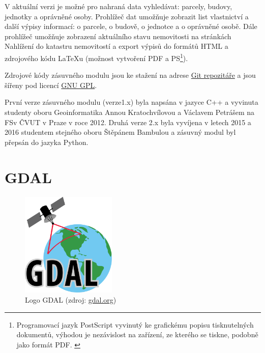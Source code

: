V aktuální verzi je možné pro nahraná data vyhledávat: parcely, budovy, jednotky
a oprávněné osoby. Prohlížeč dat umožňuje zobrazit list vlastnictví a
další výpisy informací: o parcele, o budově, o jednotce a o oprávněné
osobě. Dále prohlížeč umožňuje zobrazení aktuálního stavu nemovitosti
na stránkách Nahlížení do katastru nemovitostí a export výpisů do
formátů HTML a zdrojového kódu LaTeXu (možnost vytvoření PDF a
PS\footnote{Programovací jazyk PostScript vyvinutý ke grafickému
  popisu tisknutelných dokumentů, výhodou je nezávislost na zařízení,
  ze kterého se tiskne, podobně jako formát PDF. \cite{PostScript}}).

Zdrojové kódy zásuvného modulu jsou ke stažení na adrese
\href{https://github.com/ctu-geoforall-lab/qgis-vfk-plugin}{Git
  repozitáře} a jsou šířeny pod licencí
\href{https://raw.githubusercontent.com/ctu-osgeorel/qgis-vfk-plugin/master/LICENSE}{GNU
  GPL}.

První verze zásuvného modulu (verze1.x) byla napsána v jazyce C++ a vyvinuta studenty
oboru Geoinformatika Annou Kratochvílovou a Václavem Petrášem na FSv
ČVUT v Praze v roce 2012. Druhá verze 2.x byla vyvíjena v letech 2015
a 2016 studentem stejného oboru Štěpánem Bambulou a zásuvný modul byl
přepsán do jazyka Python. \citep{vfk_qgis_plugin}
 
\section{GDAL}
\label{sec:gdal}
\begin{figure}[H]
	 \centering
      \includegraphics[height=5cm]{./pictures/gdal-logo.png}
      \caption{Logo GDAL (zdroj:
\href{https://upload.wikimedia.org/wikipedia/commons/thumb/d/df/GDALLogoColor.svg/572px-GDALLogoColor.svg.png}{gdal.org})}
      \label{fig:gdal}
  \end{figure}
  
